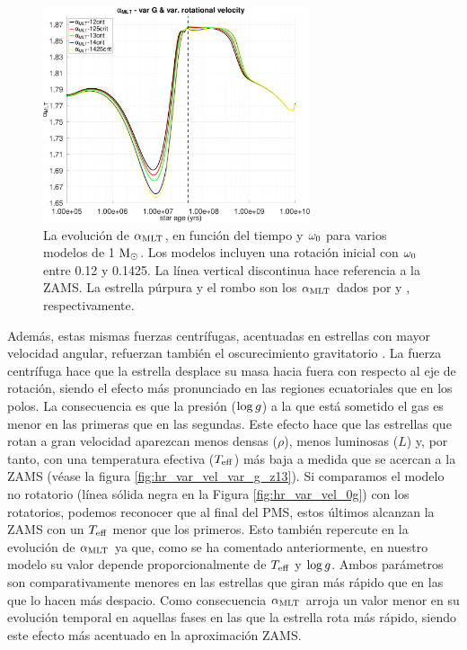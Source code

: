 \begin{figure}
	\centering
	\includegraphics[width=0.7\textwidth]{img/paper2/alpha_mlt_var_vel_g3.pdf}
	\caption{La evolución de $\alpha_{\mathrm{MLT}}$, en función del tiempo y $\omega_{\mathrm{0}}$ para varios modelos de 1 $\mathrm{M}_\odot$. Los modelos incluyen una rotación inicial con $\omega_{\mathrm{0}}$ entre 0.12 y 0.1425. La línea vertical discontinua hace referencia a la ZAMS. La estrella púrpura y el rombo son los $\alpha_{\mathrm{MLT}}$ dados por \cite{Sonoi2018} y \cite{Samadi2005}, respectivamente.}
	\label{fig:alpha_mlt_var_vel_g3}
\end{figure}

Además, estas mismas fuerzas centrífugas, acentuadas en estrellas con mayor velocidad angular, refuerzan también el oscurecimiento gravitatorio \cite[véase por ejemplo ][]{Eggenberger2012,Paxton2019,Gossage2021}. La fuerza centrífuga hace que la estrella desplace su masa hacia fuera con respecto al eje de rotación, siendo el efecto más pronunciado en las regiones ecuatoriales que en los polos. La consecuencia es que la presión ($\mathrm{log} \, g$) a la que está sometido el gas es menor en las primeras que en las segundas. Este efecto hace que las estrellas que rotan a gran velocidad aparezcan menos densas ($\rho$), menos luminosas ($L$) y, por tanto, con una temperatura efectiva ($T_{\mathrm{eff}}$) más baja a medida que se acercan a la ZAMS (véase la figura \ref{fig:hr_var_vel_var_g_z13}). Si comparamos el modelo no rotatorio (línea sólida negra en la Figura \ref{fig:hr_var_vel_0g}) con los rotatorios, podemos reconocer que al final del PMS, estos últimos alcanzan la ZAMS con un $T_{\mathrm{eff}}$ menor que los primeros. Esto también repercute en la evolución de $\alpha_{\mathrm{MLT}}$ ya que, como se ha comentado anteriormente, en nuestro modelo su valor depende proporcionalmente de $T_{\mathrm{eff}}$ y $\mathrm{log} \, g$. Ambos parámetros son comparativamente menores en las estrellas que giran más rápido que en las que lo hacen más despacio. Como consecuencia $\alpha_{\mathrm{MLT}}$ arroja un valor menor en su evolución temporal en aquellas fases en las que la estrella rota más rápido, siendo este efecto más acentuado en la aproximación ZAMS.\par

